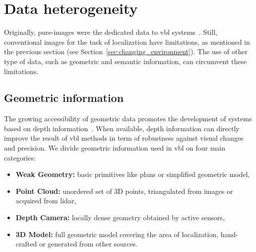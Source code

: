 \section{Data heterogeneity}
\label{sec:application}	



	Originally, pure-images were the dedicated data to \ac{vbl} systems~\citep{Robertson2004}. Still, conventional images for the task of localization have limitations, as mentioned in the previous section (see Section~\ref{sec:changing_environment}). The use of other type of data, such as geometric and semantic information, can circumvent these limitations.

	\subsection{Geometric information}
		\label{subsec:geometric_info}
		The growing accessibility of geometric data promotes the development of systems based on depth information~\citep{Paparoditis2012}. When available, depth information can directly improve the result of \ac{vbl} methods in term of robustness against visual changes and precision. We divide geometric information used in \ac{vbl} on four main categories:
		\begin{itemize}
			\item \textbf{Weak Geometry:} basic primitives like plans or simplified geometric model,
			\item \textbf{Point Cloud:} unordered set of 3D points, triangulated from images or acquired from lidar,
			\item \textbf{Depth Camera:} locally dense geometry obtained by active sensors,
			\item \textbf{3D Model:} full geometric model covering the area of localization, hand-crafted or generated from other sources.
		\end{itemize}
        
